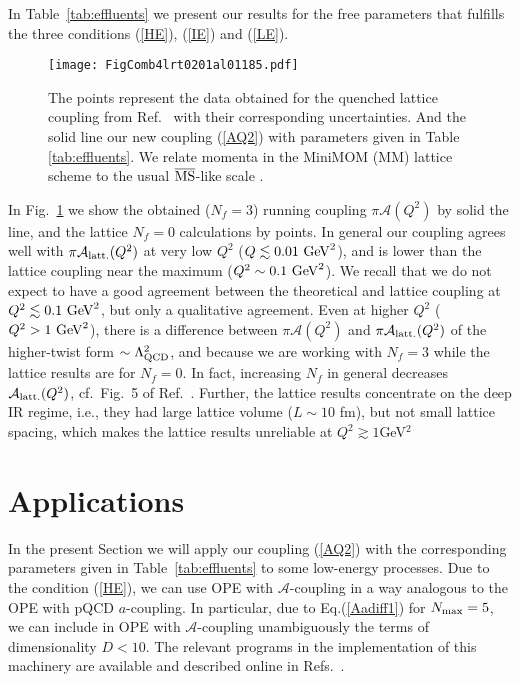 \documentclass[3p,times,twocolumn]{elsarticle}
\newcommand{\A}{{\mathcal{A}}}
\begin{document}
In Table~\ref{tab:effluents} we present our results for the free parameters that fulfills the  three conditions (\ref{HE}), (\ref{IE}) and (\ref{LE}).

\begin{figure}[htb]
\vspace{9pt}
\centering\texttt{[image: FigComb4lrt0201al01185.pdf]}
\caption{The points represent the data obtained for the quenched lattice coupling from Ref.~\cite{LattcoupNf0} with their corresponding uncertainties. And the solid line our new coupling (\ref{AQ2}) with parameters given in Table \ref{tab:effluents}. We relate momenta in the MiniMOM (MM) lattice scheme to the usual ${\overline{\rm MS}}$-like scale \cite{3danQCD1,3danQCD2}.}
\label{fig:largenenough}
\end{figure}
%

In Fig.~\ref{fig:largenenough} we show the obtained ($N_f=3$) running coupling $\pi \A(Q^2)$ by solid the line, and the lattice $N_f=0$ calculations by points. In general our coupling agrees well with $\pi \A_{\rm latt.}(Q^2)$ at very low $Q^2$ ($Q \lesssim 0.01 \ {\rm GeV}^2$), and is lower than the lattice coupling near the maximum ($Q^2 \sim 0.1 \ {\rm GeV}^2$). We recall that we do not expect to have a good agreement between the theoretical and lattice coupling at $Q^2 \lesssim 0.1 \ {\rm GeV}^2$, but only a qualitative agreement. Even at higher $Q^2$ ($Q^2 > 1 \ {\rm GeV}^2$), there is a difference between $\pi \A(Q^2)$ and $\pi \A_{\rm latt.}(Q^2)$ of the higher-twist form $\sim\Lambda_{\rm QCD}^2$, and because we are working with $N_f=3$ while the lattice results \cite{LattcoupNf0} are for $N_f=0$. In fact, increasing $N_f$ in general decreases $\A_{\rm latt.}(Q^2)$, cf.~Fig.~5 of Ref.~\cite{LattcoupNf2}. Further, the lattice results concentrate on the deep IR regime, i.e., they had large lattice volume ($L \sim 10$ fm), but not small lattice spacing, which makes the lattice results \cite{LattcoupNf0,LattcoupNf2} unreliable at $Q^2\gtrsim1$GeV$^2$
 
\section{Applications}

In the present Section we will apply our coupling (\ref{AQ2}) with the corresponding parameters given in Table~\ref{tab:effluents} to some low-energy processes. 
Due to the condition (\ref{HE}), we can use OPE with $\A$-coupling in a way analogous to the OPE with pQCD $a$-coupling. In particular, due to Eq.(\ref{Aadiff1}) for $N_{\rm max}=5$, we can include in OPE with $\A$-coupling unambiguously the terms of dimensionality $D < 10$. The relevant programs in the implementation of this machinery are available and described online in Refs.~\cite{prgs,mathprg}.
\end{document}
